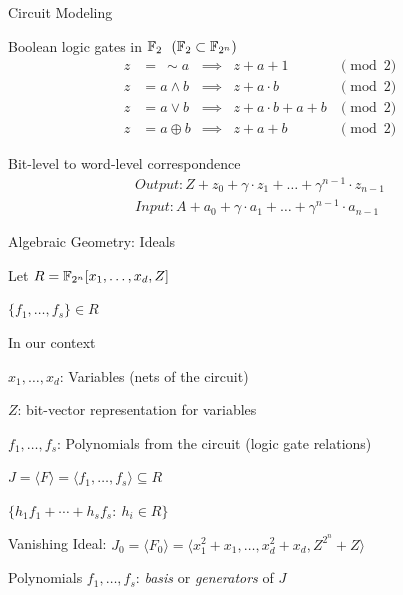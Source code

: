 \begin{frame}{\large Circuit Modeling}
\bi
	\item Boolean logic gates in ${\mathbb{F}}_2 ~~({\mathbb{F}}_2 \subset {\mathbb{F}}_{2^n})$
\ei
	\begin{align*}
		 z &=~ \sim a &\implies &z+a+1 &\pmod{2}\\
		 z &= a \wedge b &\implies &z+a\cdot b &\pmod{2}\\
		 z &= a \vee b &\implies &z+a\cdot b + a + b &\pmod{2}\\
		 z &= a \oplus b &\implies &z+a+b &\pmod{2}
	\end{align*}

\bi
	\item Bit-level to word-level correspondence
\ei
\begin{equation*}
\begin{split}
 Output:  Z + z_0 +\gamma \cdot  z_1 + \dots +\gamma^{n-1} \cdot z_{n-1}\\
 Input:  A + a_0 +\gamma \cdot a_1 + \dots +\gamma^{n-1} \cdot a_{n-1}
\end{split}
\end{equation*}
\end{frame}

\begin{frame}{\large Algebraic Geometry: Ideals}
\bi
	\item Let $R={\mathbb{F}}_{2^n}[x_1,\dots,x_d,Z]$
	\bi
		\item $\{f_1, \dots, f_s\} \in R$
	\ei
	\vspace{0.1in}
	\item In our context
	\bi
		\item $x_1,\dots,x_d$: Variables (nets of the circuit)
		\item $Z$: bit-vector representation for variables
		\item $f_1, \dots, f_s$: Polynomials from the circuit (logic gate relations)
	\ei
	\vspace{0.1in}
	\item $J = \langle F \rangle = \langle f_1, \dots, f_s \rangle \subseteq R$
	\bi
		\item $\{h_1f_1 + \cdots + h_sf_s:~h_i \in R\}$
	\ei
	\vspace{0.1in}
	\item Vanishing Ideal: $J_0 = \langle F_0 \rangle =  \langle x_1^2+x_1,\dots,x_d^2+x_d, Z^{2^n}+Z\rangle$
	\vspace{0.1in}
	\item Polynomials $f_1, \dots, f_s$: {\it basis} or {\it generators} of $J$
\ei
\end{frame}

